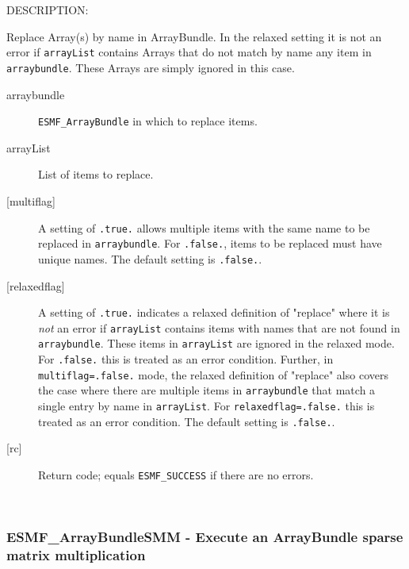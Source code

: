 {\sf DESCRIPTION:\\ }


     Replace Array(s) by name in ArrayBundle. In the relaxed setting it is not
     an error if {\tt arrayList} contains Arrays that do not match by name any
     item in {\tt arraybundle}. These Arrays are simply ignored in this case.
  
     \begin{description}
     \item [arraybundle]
       {\tt ESMF\_ArrayBundle} in which to replace items.
     \item [arrayList]
       List of items to replace.
     \item [{[multiflag]}]
       A setting of {\tt .true.} allows multiple items with the same name
       to be replaced in {\tt arraybundle}. For {\tt .false.}, items to be
       replaced must have unique names. The default setting is {\tt .false.}.
     \item [{[relaxedflag]}]
       A setting of {\tt .true.} indicates a relaxed definition of "replace"
       where it is {\em not} an error if {\tt arrayList} contains items with
       names that are not found in {\tt arraybundle}. These items in 
       {\tt arrayList} are ignored in the relaxed mode. For {\tt .false.} this
       is treated as an error condition.
       Further, in {\tt multiflag=.false.} mode, the relaxed definition of
       "replace" also covers the case where there are multiple items in
       {\tt arraybundle} that match a single entry by name in {\tt arrayList}.
       For {\tt relaxedflag=.false.} this is treated as an error condition.
       The default setting is {\tt .false.}.
     \item [{[rc]}]
       Return code; equals {\tt ESMF\_SUCCESS} if there are no errors.
     \end{description}
   
 
\mbox{}\hrulefill\ 
 
\subsubsection [ESMF\_ArrayBundleSMM] {ESMF\_ArrayBundleSMM - Execute an ArrayBundle sparse matrix multiplication}


